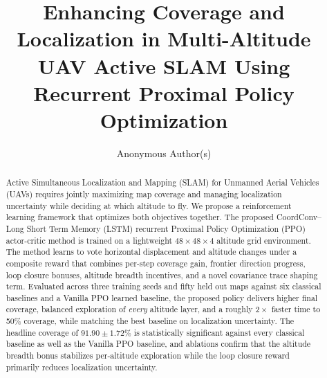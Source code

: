 \documentclass[runningheads]{llncs}
\begin{document}
\title{Enhancing Coverage and Localization in Multi-Altitude UAV Active SLAM Using Recurrent Proximal Policy Optimization}


\author{Anonymous Author(s)}


\maketitle

\begin{abstract}
Active Simultaneous Localization and Mapping (SLAM) for Unmanned Aerial Vehicles (UAVs) requires jointly maximizing map coverage and managing localization uncertainty while deciding at which altitude to fly. We propose a reinforcement learning framework that optimizes both objectives together. The proposed CoordConv--Long Short Term Memory (LSTM) recurrent Proximal Policy Optimization (PPO) actor-critic method is trained on a lightweight $48\times48\times4$ altitude grid environment. The method learns to vote horizontal displacement and altitude changes under a composite reward that combines per-step coverage gain, frontier direction progress, loop closure bonuses, altitude breadth incentives, and a novel covariance trace shaping term. Evaluated across three training seeds and fifty held out maps against six classical baselines and a Vanilla PPO learned baseline, the proposed policy delivers higher final coverage, balanced exploration of \emph{every} altitude layer, and a roughly $2\times$ faster time to 50\% coverage, while matching the best baseline on localization uncertainty. The headline coverage of $91.90 \pm 1.72\%$ is statistically significant against every classical baseline as well as the Vanilla PPO baseline, and ablations confirm that the altitude breadth bonus stabilizes per-altitude exploration while the loop closure reward primarily reduces localization uncertainty.
\end{abstract}
\end{document}
